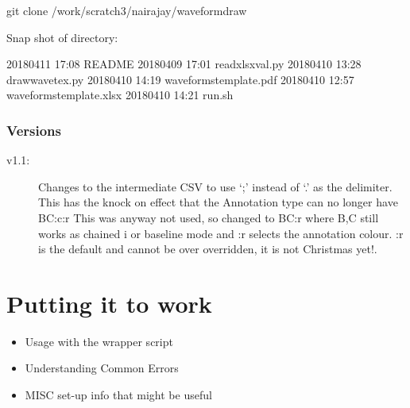 \documentclass[letterpaper,10pt,english]{sphinxmanual}
\begin{document}
%
\begin{sphinxVerbatim}[commandchars=\\\{\}]
\PYGZdl{} git clone /work/scratch3/nairajay/waveform\PYGZus{}draw
\end{sphinxVerbatim}

Snap shot of directory:

%
\begin{sphinxVerbatim}[commandchars=\\\{\}]
  2018\PYGZhy{}04\PYGZhy{}11 17:08 README
  2018\PYGZhy{}04\PYGZhy{}09 17:01 read\PYGZus{}xlsx\PYGZus{}val.py
 2018\PYGZhy{}04\PYGZhy{}10 13:28 draw\PYGZus{}wave\PYGZus{}tex.py
 2018\PYGZhy{}04\PYGZhy{}10 14:19 waveforms\PYGZus{}template.pdf
 2018\PYGZhy{}04\PYGZhy{}10 12:57 waveforms\PYGZus{}\PYGZus{}template.xlsx
  2018\PYGZhy{}04\PYGZhy{}10 14:21 run.sh
\end{sphinxVerbatim}


\subsubsection{Versions}
\label{\detokenize{intro:versions}}\begin{description}
\item[{v1.1:}] \leavevmode
Changes to the intermediate CSV to use ‘;’ instead of ‘.’ as the delimiter.
This has the knock on effect that the Annotation type can no longer have B\textbar{}C:c:r
This was anyway not used, so changed to B\textbar{}C:r where B,C still works as chained i
or baseline mode and  :r selects the annotation colour.
:r is the default and cannot be over overridden, it is not Christmas yet!.

\end{description}


\section{Putting it to work}
\label{\detokenize{intro:putting-it-to-work}}\begin{itemize}
\item {} 
Usage with the wrapper script

\item {} 
Understanding Common Errors

\item {} 
MISC set-up info that might be useful

\end{itemize}
\end{document}
